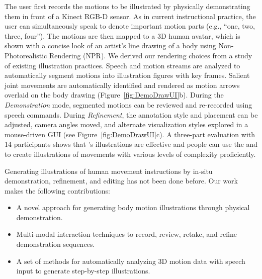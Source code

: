 The user first records the motions to be illustrated by physically demonstrating them in front of a Kinect RGB-D sensor. As in current instructional practice, the user can simultaneously speak to denote important motion parts (e.g., ``one, two, three, four'').
The motions are then mapped to a 3D human avatar, which is shown with a concise look of an artist's line drawing of a body using Non-Photorealistic Rendering (NPR). We derived our rendering choices from a study of existing illustration practices.
%
Speech and motion streams are analyzed to automatically segment motions into illustration figures with key frames. Salient joint movements are automatically identified and rendered as motion arrows overlaid on the body drawing (Figure~\ref{fig:DemoDrawUI}b).
%
During the {\em Demonstration} mode, segmented motions can be reviewed and re-recorded using speech commands. %
%
During \emph{Refinement}, the annotation style and placement can be adjusted, camera angles moved, and alternate visualization styles explored in a mouse-driven GUI (see Figure~\ref{fig:DemoDrawUI}c).
%
A three-part evaluation with 14 participants shows that \systemname{}'s illustrations are effective and people can use the \phaseI{} and \phaseII{} to create illustrations of movements with various levels of complexity proficiently.

Generating illustrations of human movement instructions by in-situ demonstration, refinement, and editing has not been done before.
Our work makes the following contributions:
\begin{itemize}
  \item A novel approach for generating body motion illustrations through physical demonstration.
  \item Multi-modal interaction techniques to record, review, retake, and refine demonstration sequences.
  \item A set of methods for automatically analyzing 3D motion data with speech input to generate step-by-step illustrations.
\end{itemize}


